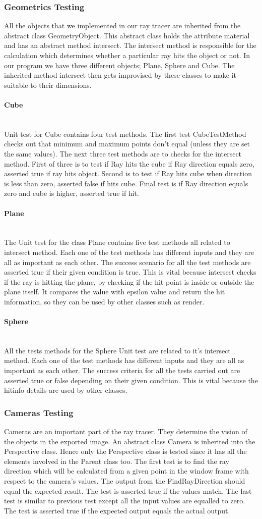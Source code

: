 \documentclass[a4paper]{report}
\newcommand{
	\subsubsubsection}[1]
{\paragraph{#1}\mbox{}\\[.35em]}
\begin{document}
	\subsubsection{Geometrics Testing}
	All the objects that we implemented in our ray tracer are inherited from the abstract class GeometryObject. This abstract class holds the attribute material and has an abstract method intersect. The intersect method is responsible for the calculation which determines whether a particular ray hits the object or not. In our program we have three different objects; Plane, Sphere and Cube. The inherited method intersect then gets improvised by these classes to make it suitable to their dimensions.
	\subsubsubsection{Cube}
	Unit test for Cube contains four test methods. The first test CubeTestMethod checks out that minimum and maximum points don’t equal (unless they are set the same values). The next three test methods are to checks for the intersect method. First of three is to test if Ray hits the cube if Ray direction equals zero, asserted true if ray hits object. Second is to test if Ray hits cube when direction is less than zero, asserted false if hits cube. Final test is if Ray direction equals zero and cube is higher, asserted true if hit.
	\subsubsubsection{Plane}
	The Unit test for the class Plane contains five test methods all related to intersect method. Each one of the test methods has different inputs and they are all as important as each other. The success scenario for all the test methods are asserted true if their given condition is true. This is vital because intersect checks if the ray is hitting the plane, by checking if the hit point is inside or outside the plane itself. It compares the value with epsilon value and return the hit information, so they can be used by other classes such as render.
	\subsubsubsection{Sphere}
	All the tests methods for the Sphere Unit test are related to it’s intersect method. Each one of the test methods has different inputs and they are all as important as each other. The success criteria for all the tests carried out are asserted true or false depending on their given condition. This is vital because the hitinfo details are used by other classes.
	\subsubsection{Cameras Testing}
	Cameras are an important part of the ray tracer. They determine the vision of the objects in the exported image. An abstract class Camera is inherited into the Perspective class. Hence only the Perspective class is tested since it has all the elements involved in the Parent class too. 
	The first test is to find the ray direction which will be calculated from a given point in the window frame with respect to the camera’s values. The output from the FindRayDirection should equal the expected result. The test is asserted true if the values match. 
	The last test is similar to previous test except all the input values are equalled to zero. The test is asserted true if the expected output equals the actual output.
\end{document}
